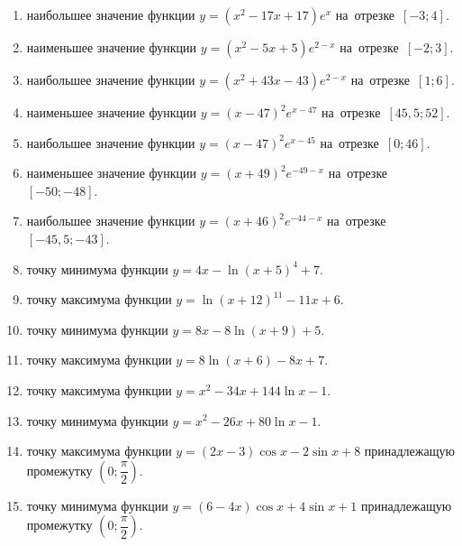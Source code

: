 \documentclass[a4paper,10pt]{article}
\begin{document}
\begin{enumerate}
\item {} наибольшее значение функции $y=\left(x^2 -17x +17\right)e^{x}$ на~отрезке~$\left[-3;4\right]$.

\item {} наименьшее значение функции $y=\left(x^2 -5x +5\right)e^{2-x}$ на~отрезке~$\left[-2;3\right]$.

\item {} наибольшее значение функции $y=\left(x^2 +43x -43\right)e^{2-x}$ на~отрезке~$\left[1;6\right]$.

\item {} наименьшее значение функции $y=\left(x-47\right)^2e^{x-47}$ на~отрезке~$\left[45,5;52\right]$.

\item {} наибольшее значение функции $y=\left(x-47\right)^2e^{x-45}$ на~отрезке~$\left[0;46\right]$.

\item {} наименьшее значение функции $y=\left(x+49\right)^2e^{-49-x}$ на~отрезке~$\left[-50;-48\right]$.

\item {} наибольшее значение функции $y=\left(x+46\right)^2e^{-44-x}$ на~отрезке~$\left[-45,5;-43\right]$.

\item {} точку минимума функции $y=4x-\ln\left(x+5\right)^{4}+7$.

\item {} точку максимума функции $y=\ln\left(x+12\right)^{11}-11x+6$.

\item {} точку минимума функции $y=8x-8\ln\left(x+9\right)+5$.

\item {} точку максимума функции $y=8\ln\left(x+6\right)-8x+7$.

\item {} точку максимума функции $y=x^2-34x+144\ln x -1$.

\item {} точку минимума функции $y=x^2-26x+80\ln x -1$.

\item {} точку максимума функции $y=\left(2x-3\right)\cos x -2\sin x+8$
принадлежащую промежутку $\left(0;\dfrac{\pi}{2}\right)$.

\item {} точку минимума функции $y=\left(6-4x\right)\cos x +4\sin x+1$
принадлежащую промежутку $\left(0;\dfrac{\pi}{2}\right)$.


\end{enumerate}
\end{document}
